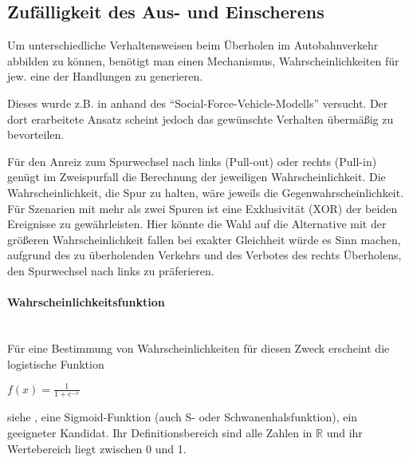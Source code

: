 %
%
%




\subsection{Zufälligkeit des Aus- und Einscherens}
\label{sec:pullout-pullin}

Um unterschiedliche Verhaltensweisen beim Überholen im Autobahnverkehr abbilden zu können, benötigt man einen Mechanismus, Wahrscheinlichkeiten für jew. eine der Handlungen zu generieren.

Dieses wurde z.B. in \cite{dat-ba} anhand des \enquote{Social-Force-Vehicle-Modells} versucht. 
Der dort erarbeitete Ansatz scheint jedoch das gewünschte Verhalten übermäßig zu bevorteilen.

Für den Anreiz zum Spurwechsel nach links (Pull-out) oder rechts (Pull-in) genügt im Zweispurfall die Berechnung der jeweiligen Wahrscheinlichkeit.
Die Wahrscheinlichkeit, die Spur zu halten, wäre jeweils die Gegenwahrscheinlichkeit.
\\
Für Szenarien mit mehr als zwei Spuren ist eine Exklusivität (XOR) der beiden Ereignisse zu gewährleisten.
Hier könnte die Wahl auf die Alternative mit der größeren Wahrscheinlichkeit fallen bei exakter Gleichheit würde es Sinn machen, aufgrund des zu überholenden Verkehrs und des Verbotes des rechts Überholens, den Spurwechsel nach links zu präferieren.

\paragraph*{Wahrscheinlichkeitsfunktion} 
\hfill \\
Für eine Bestimmung von Wahrscheinlichkeiten für diesen Zweck erscheint die logistische Funktion  
\begin{center}
$ f(x) = \frac{1}{1 + e^{-x}} $ 
\end{center}
siehe \cite{logistic-function}, eine Sigmoid-Funktion (auch S- oder Schwanenhalsfunktion), ein geeigneter Kandidat. 
Ihr Definitionsbereich sind alle Zahlen in $ \mathbb{R} $ und ihr Wertebereich liegt zwischen 0 und 1.

